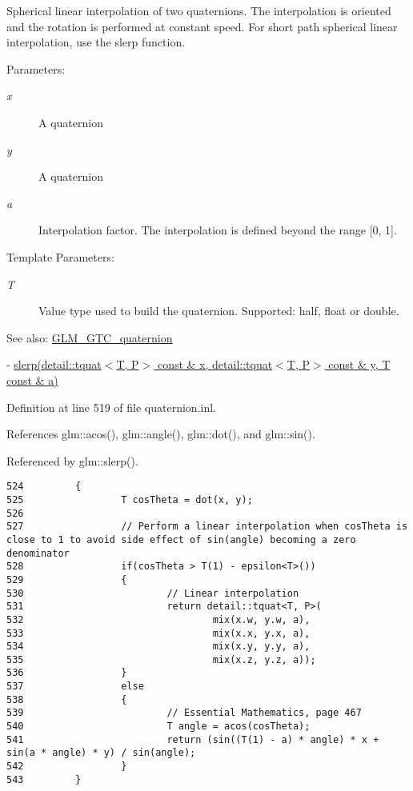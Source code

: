 Spherical linear interpolation of two quaternions. The interpolation is oriented and the rotation is performed at constant speed. For short path spherical linear interpolation, use the slerp function.

\begin{Desc}
\item[Parameters:]
\begin{description}
\item[{\em x}]A quaternion \item[{\em y}]A quaternion \item[{\em a}]Interpolation factor. The interpolation is defined beyond the range \mbox{[}0, 1\mbox{]}. \end{description}
\end{Desc}
\begin{Desc}
\item[Template Parameters:]
\begin{description}
\item[{\em T}]Value type used to build the quaternion. Supported: half, float or double. \end{description}
\end{Desc}
\begin{Desc}
\item[See also:]\hyperlink{group__gtc__quaternion}{GLM\_\-GTC\_\-quaternion} 

- \hyperlink{group__gtc__quaternion_ga75cee4315cd8e7f15eaac3ea944106a}{slerp(detail::tquat$<$T, P$>$ const \& x, detail::tquat$<$T, P$>$ const \& y, T const \& a)} \end{Desc}


Definition at line 519 of file quaternion.inl.

References glm::acos(), glm::angle(), glm::dot(), and glm::sin().

Referenced by glm::slerp().

\begin{Code}\begin{verbatim}524         {
525                 T cosTheta = dot(x, y);
526 
527                 // Perform a linear interpolation when cosTheta is close to 1 to avoid side effect of sin(angle) becoming a zero denominator
528                 if(cosTheta > T(1) - epsilon<T>())
529                 {
530                         // Linear interpolation
531                         return detail::tquat<T, P>(
532                                 mix(x.w, y.w, a),
533                                 mix(x.x, y.x, a),
534                                 mix(x.y, y.y, a),
535                                 mix(x.z, y.z, a));
536                 }
537                 else
538                 {
539                         // Essential Mathematics, page 467
540                         T angle = acos(cosTheta);
541                         return (sin((T(1) - a) * angle) * x + sin(a * angle) * y) / sin(angle);
542                 }
543         }
\end{verbatim}
\end{Code}




